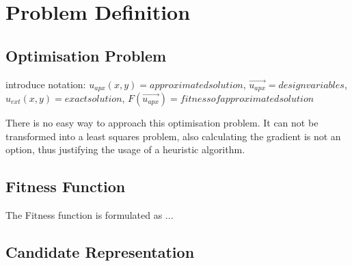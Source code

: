 \documentclass[./\jobname.tex]{subfiles}
\begin{document}
\chapter{Problem Definition}

\section{Optimisation Problem}
\label{chap:opt_problem}

introduce notation: $u_{apx}(x,y) = approximated solution$, $\vec{u_{apx}} = design variables$, $u_{ext}(x,y) = exact solution$, $F(\vec{u_{apx}}) = fitness of approximated solution$

There is no easy way to approach this optimisation problem. It can not be transformed into a least squares problem, also calculating the gradient is not an option, thus justifying the usage of a heuristic algorithm.  

\section{Fitness Function}
\label{chap:fit_func}
The Fitness function is formulated as ... 


\section{Candidate Representation}
\label{chap:candidate_rep}
\end{document}

